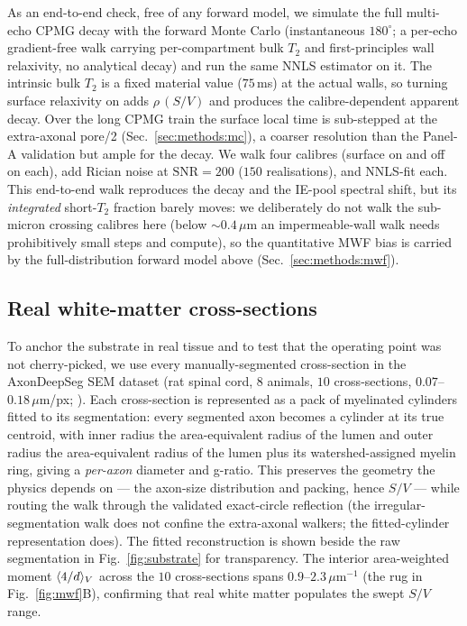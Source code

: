 As an end-to-end check, free of any forward model, we simulate the full multi-echo CPMG
decay with the forward Monte Carlo (instantaneous $180^\circ$; a per-echo
gradient-free walk carrying per-compartment bulk $T_2$ and first-principles wall relaxivity,
no analytical decay) and run the same NNLS estimator on it. The intrinsic bulk $T_2$ is a
fixed material value ($75$\,ms) at the actual walls, so turning surface relaxivity on adds
$\rho\,(S/V)$ and produces the calibre-dependent apparent decay. Over the long CPMG train the
surface local time is sub-stepped at the extra-axonal pore/2 (Sec.~\ref{sec:methods:mc}), a
coarser resolution than the Panel-A validation but ample for the decay. We walk four calibres
(surface on and off on each), add Rician noise at $\mathrm{SNR}=200$ ($150$ realisations), and
NNLS-fit each. This end-to-end walk reproduces the decay and the IE-pool spectral shift, but
its \emph{integrated} short-$T_2$ fraction barely moves: we deliberately do not walk the
sub-micron crossing calibres here (below ${\sim}0.4\,\mu$m an impermeable-wall walk needs
prohibitively small steps and compute), so the quantitative MWF bias is carried by the
full-distribution forward model above (Sec.~\ref{sec:methods:mwf}).

\subsection{Real white-matter cross-sections}
\label{sec:methods:real}

To anchor the substrate in real tissue and to test that the operating point was not
cherry-picked, we use every manually-segmented cross-section in the
AxonDeepSeg SEM dataset (rat spinal cord, $8$ animals, $10$ cross-sections,
$0.07$--$0.18\,\mu$m/px; \citealp{Zaimi2018}). Each cross-section is represented as
a pack of myelinated cylinders fitted to its segmentation: every segmented axon
becomes a cylinder at its true centroid, with inner radius the area-equivalent
radius of the lumen and outer radius the area-equivalent radius of the lumen plus
its watershed-assigned myelin ring, giving a \emph{per-axon} diameter and g-ratio.
This preserves the geometry the physics depends on --- the axon-size distribution
and packing, hence $S/V$ --- while routing the walk through the validated exact-circle
reflection (the irregular-segmentation walk does not confine the extra-axonal
walkers; the fitted-cylinder representation does). The fitted reconstruction is
shown beside the raw segmentation in Fig.~\ref{fig:substrate} for transparency. The
interior area-weighted moment $\langle 4/d\rangle_{V}$ across the $10$ cross-sections
spans $0.9$--$2.3\,\mu$m$^{-1}$ (the rug in Fig.~\ref{fig:mwf}B), confirming that
real white matter populates the swept $S/V$ range.


